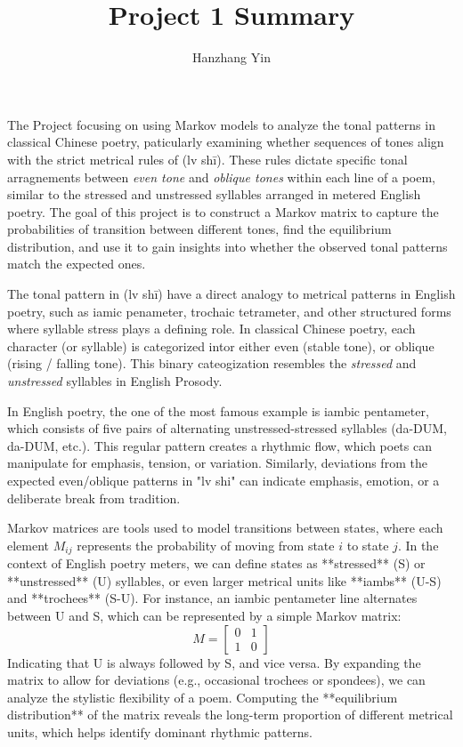 \documentclass[12pt]{article}
\title{\vspace{-2cm}Project 1 Summary}
\author{Hanzhang Yin}
\begin{document}
\maketitle

The Project focusing on using Markov models to analyze the tonal patterns in classical Chinese poetry, paticularly examining whether sequences of tones align with the strict metrical rules of 
(lv shī). These rules dictate specific tonal arragnements between \textit{even tone} and \textit{oblique tones} within each line of a poem, similar to the stressed and unstressed syllables arranged in metered English
poetry. The goal of this project is to construct a Markov matrix to capture the probabilities of transition between different tones, find the equilibrium distribution, and use it to gain 
insights into whether the observed tonal patterns match the expected ones.

The tonal pattern in (lv shī) have a direct analogy to metrical patterns in English poetry, such as iamic penameter, trochaic tetrameter, and other structured forms where syllable stress plays a defining role.
In classical Chinese poetry, each character (or syllable) is categorized intor either even (stable tone), or oblique (rising / falling tone). This binary cateogization resembles the \textit{stressed} and \textit{unstressed} syllables 
in English Prosody.

In English poetry, the one of the most famous example is iambic pentameter, which consists of five pairs of alternating unstressed-stressed syllables (da-DUM, da-DUM, etc.). 
This regular pattern creates a rhythmic flow, which poets can manipulate for emphasis, tension, or variation.
Similarly, deviations from the expected even/oblique patterns in "lv shi" can indicate emphasis, emotion, or a deliberate break from tradition.

Markov matrices are tools used to model transitions between states, where each element \( M_{ij} \) represents the probability of moving from state \( i \) to state \( j \). In the context of English poetry meters, we can define states as **stressed** (S) or **unstressed** (U) syllables, or even larger metrical units like **iambs** (U-S) and **trochees** (S-U). For instance, an iambic pentameter line alternates between U and S, which can be represented by a simple Markov matrix: 
\[
    M = \begin{bmatrix} 0 & 1 \\ 1 & 0 \end{bmatrix}
\]
Indicating that U is always followed by S, and vice versa. By expanding the matrix to allow for deviations (e.g., occasional trochees or spondees), we can analyze the stylistic flexibility of a poem.
Computing the **equilibrium distribution** of the matrix reveals the long-term proportion of different metrical units, which helps identify dominant rhythmic patterns.
\end{document}
